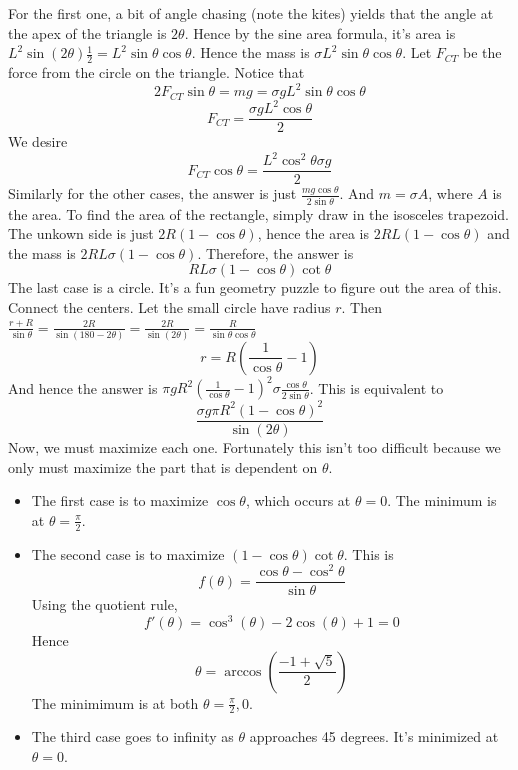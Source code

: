 \documentclass[11pt]{scrartcl}
\begin{document}
\begin{soln}
  For the first one, a bit of angle chasing (note the kites) yields that the angle at the apex of the triangle is $2\theta$.
  Hence by the sine area formula, it's area is $L^2\sin(2\theta)\frac{1}{2}=L^2\sin\theta\cos\theta$. Hence the mass is $\sigma L^2\sin\theta\cos\theta$.
  Let $F_{CT}$ be the force from the circle on the triangle. Notice that
  $$2F_{CT}\sin\theta=mg=\sigma g L^2\sin\theta\cos\theta$$
  $$F_{CT}=\frac{\sigma g L^2\cos\theta}{2}$$
  We desire
  $$F_{CT}\cos\theta=\frac{L^2\cos^2\theta \sigma g}{2}$$
  Similarly for the other cases, the answer is just $\frac{mg\cos\theta}{2\sin\theta}$.
  And $m=\sigma A$, where $A$ is the area. To find the area of the rectangle, simply draw in the isosceles trapezoid.
  The unkown side is just $2R(1-\cos\theta)$, hence the area is $2RL(1-\cos\theta)$ and the mass is $2RL\sigma(1-\cos\theta)$. Therefore, the answer is
  $$RL\sigma (1-\cos\theta)\cot\theta$$
  The last case is a circle. It's a fun geometry puzzle to figure out the area of this. Connect the centers.
  Let the small circle have radius $r$. Then
  $\frac{r+R}{\sin\theta}=\frac{2R}{\sin(180-2\theta)}=\frac{2R}{\sin(2\theta)}=\frac{R}{\sin\theta\cos\theta}$
  $$r=R\left(\frac{1}{\cos\theta}-1\right)$$
  And hence the answer is $\pi g R^2\left(\frac{1}{\cos\theta}-1\right)^2\sigma\frac{\cos\theta}{2\sin\theta}$.
  This is equivalent to
  $$\frac{\sigma g\pi R^2(1-\cos\theta)^2}{\sin(2\theta)}$$
  Now, we must maximize each one. Fortunately this isn't too difficult because
  we only must maximize the part that is dependent on $\theta$.
  \begin{itemize}
    \item The first case is to maximize $\cos\theta$, which occurs at
      $\theta=0$. The minimum is at $\theta=\frac{\pi}{2}$.
    \item The second case is to maximize $(1-\cos\theta)\cot\theta$. This is
      $$f(\theta)=\frac{\cos\theta-\cos^2\theta}{\sin\theta}$$
      Using the quotient rule,
      $$f'(\theta)=\cos^3(\theta)-2\cos(\theta)+1=0$$
      Hence
      $$\theta=\arccos\left(\frac{-1+\sqrt{5}}{2}\right)$$
      The minimimum is at both $\theta=\frac{\pi}{2}, 0$.
    \item The third case goes to infinity as $\theta$ approaches
      45 degrees. It's minimized at $\theta=0$.
  \end{itemize}
\end{soln}
\end{document}
